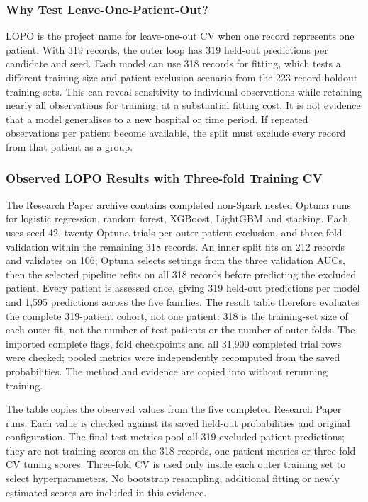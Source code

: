 \subsubsection{Why Test Leave-One-Patient-Out?}
LOPO is the project name for leave-one-out CV when one record represents one patient. With 319 records, the outer loop has 319 held-out predictions per candidate and seed. Each model can use 318 records for fitting, which tests a different training-size and patient-exclusion scenario from the 223-record holdout training sets. This can reveal sensitivity to individual observations while retaining nearly all observations for training, at a substantial fitting cost. It is not evidence that a model generalises to a new hospital or time period. If repeated observations per patient become available, the split must exclude every record from that patient as a group.

\subsubsection{Observed LOPO Results with Three-fold Training CV}
The Research Paper archive contains completed non-Spark nested Optuna runs for logistic regression, random forest, XGBoost, LightGBM and stacking. Each uses seed 42, twenty Optuna trials per outer patient exclusion, and three-fold validation within the remaining 318 records. An inner split fits on 212 records and validates on 106; Optuna selects settings from the three validation AUCs, then the selected pipeline refits on all 318 records before predicting the excluded patient. Every patient is assessed once, giving 319 held-out predictions per model and 1,595 predictions across the five families. The result table therefore evaluates the complete 319-patient cohort, not one patient: 318 is the training-set size of each outer fit, not the number of test patients or the number of outer folds. The imported complete flags, fold checkpoints and all 31,900 completed trial rows were checked; pooled metrics were independently recomputed from the saved probabilities. The method and evidence are copied into  without rerunning training.



The table copies the observed  values from the five completed Research Paper runs. Each value is checked against its saved held-out probabilities and original configuration. The final test metrics pool all 319 excluded-patient predictions; they are not training scores on the 318 records, one-patient metrics or three-fold CV tuning scores. Three-fold CV is used only inside each outer training set to select hyperparameters. No bootstrap resampling, additional fitting or newly estimated scores are included in this evidence.

